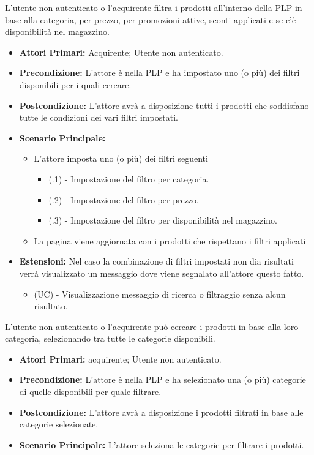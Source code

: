 L'utente non autenticato o l'acquirente filtra i prodotti all'interno della PLP in base alla categoria, per prezzo, per promozioni attive, sconti applicati e se c'è disponibilità nel magazzino.
\begin{itemize}
    \item \textbf{Attori Primari:} Acquirente; Utente non autenticato.
    \item \textbf{Precondizione:} L'attore è nella PLP e ha impostato uno (o più) dei filtri disponibili per i quali cercare.
    \item \textbf{Postcondizione:} L'attore avrà a disposizione tutti i prodotti che soddisfano tutte le condizioni dei vari filtri impostati.
    \item \textbf{Scenario Principale:}
    \begin{itemize}
        \item L'attore imposta uno (o più) dei filtri seguenti 
        \begin{itemize}
            \item (\actualUC.1) - Impostazione del filtro per categoria.
            \item (\actualUC.2) - Impostazione del filtro per prezzo.
            \item (\actualUC.3) - Impostazione del filtro per disponibilità nel magazzino.
        \end{itemize}
        \item La pagina viene aggiornata con i prodotti che rispettano i filtri applicati
    \end{itemize}
    \item \textbf{Estensioni:} Nel caso la combinazione di filtri impostati non dia risultati verrà visualizzato un messaggio dove viene segnalato all'attore questo fatto.
    \begin{itemize}
    	\item (UC) - Visualizzazione messaggio di ricerca o filtraggio senza alcun risultato.
    \end{itemize}
\end{itemize}

\resetSubUC

L'utente non autenticato o l'acquirente può cercare i prodotti in base alla loro categoria, selezionando tra tutte le categorie disponibili.
\begin{itemize}
    \item \textbf{Attori Primari:} acquirente; Utente non autenticato.
    \item \textbf{Precondizione:} L'attore è nella PLP e ha selezionato una (o più) categorie di quelle disponibili per quale filtrare.
    \item \textbf{Postcondizione:} L'attore avrà a disposizione i prodotti filtrati in base alle categorie selezionate.
    \item \textbf{Scenario Principale:} L'attore seleziona le categorie per filtrare i prodotti.
\end{itemize}

